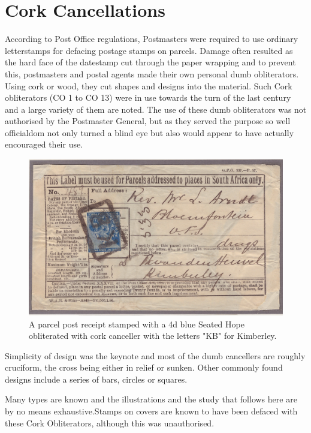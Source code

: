 \section{Cork Cancellations
} 
According to Post Office regulations, Postmasters were required to use ordinary letterstamps for defacing postage stamps on parcels. Damage often resulted as the hard face of the datestamp cut through the paper wrapping and to prevent this, postmasters and postal agents made their own personal dumb obliterators. Using cork or wood, they cut shapes and designs into the material. Such Cork obliterators (CO 1 to CO 13) were in use towards the turn of the last century and a large variety of them are noted. The use of these dumb obliterators was not authorised by the Postmaster General, but as they served the purpose so well officialdom not only turned a blind eye but also would appear to have actually encouraged their use.

\begin{figure}
\includegraphics[width=1.0\textwidth]{../cape-of-good-hope/cork-kimberley.jpg}
\caption{A parcel post receipt stamped with a 4d blue Seated Hope obliterated with cork canceller with the letters "KB" for Kimberley.}
\end{figure}


 

Simplicity of design was the keynote and most of the dumb cancellers are roughly cruciform, the cross being either in relief or sunken. Other commonly found designs include a series of bars, circles or squares.
	 
Many types are known and the illustrations and the study that follows here are by no means exhaustive.Stamps on covers are known to have been defaced with these Cork Obliterators, although this was unauthorised.

